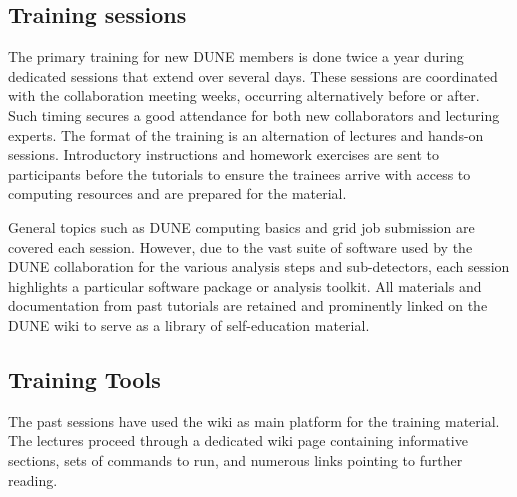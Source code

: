 \documentclass[../main-v1.tex]{subfiles}
\begin{document}

\subsection{Training sessions}
The primary training for new DUNE members is done twice a year during  dedicated sessions that extend over several days. These sessions are coordinated with the collaboration meeting weeks, occurring alternatively before or after. Such timing secures a good attendance for both new collaborators and lecturing experts.
The format of the training is an alternation of lectures and hands-on sessions. Introductory instructions and homework exercises are sent to participants before the tutorials to ensure the trainees arrive with access to computing resources and are prepared for the material. %


General topics such as DUNE computing basics and grid job submission are covered each %
session. However, due to the vast suite of software used by the DUNE collaboration for the various analysis steps and sub-detectors, each %
session highlights a particular software package or analysis toolkit.  All materials and documentation from past tutorials are retained and prominently linked on the DUNE wiki to serve as a library of self-education material. %

\subsection{Training Tools}
The past sessions have used the wiki as main %
platform for the training material. The lectures proceed through a dedicated wiki page containing informative sections, sets of commands to run, and numerous links pointing to further reading.
\end{document}
